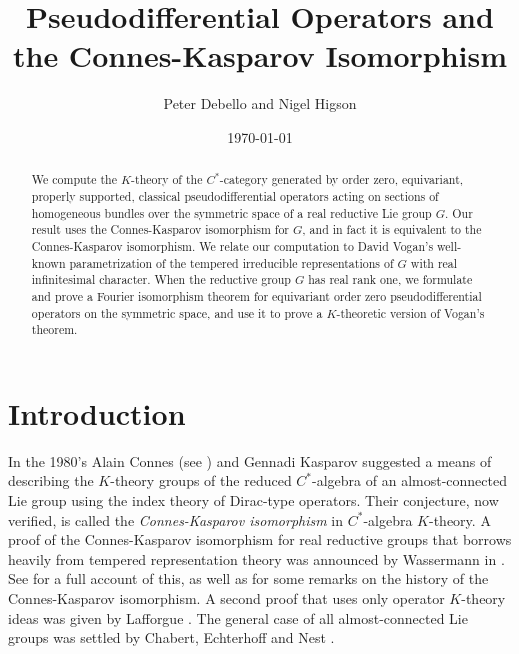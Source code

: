 \documentclass[leqno,11pt]{amsart}
\numberwithin{equation}{subsection}
\theoremstyle{plain}
\theoremstyle{definition}
\theoremstyle{remark}
\begin{document}
 
\title[Pseudodifferential Operators and Connes-Kasparov]{Pseudodifferential Operators and the Connes-Kasparov Isomorphism} 
\author{Peter Debello and Nigel Higson}
\address{Department of Mathematics, Penn State University, University Park, PA 16802, USA}
 



\date{\today}

\begin{abstract}
We compute the $K$-theory of the $C^*$-category generated by order zero, equivariant, properly supported, classical  pseudodifferential  operators acting on sections of homogeneous bundles over the symmetric space  of a real reductive Lie group $G$. Our result uses the Connes-Kasparov isomorphism for $G$, and in fact it is equivalent to the Connes-Kasparov isomorphism.  We relate our computation to David Vogan's well-known param\-etrization of the tempered irreducible representations of $G$ with real infinitesimal character.  When the reductive group $G$ has real rank one, we formulate and prove a Fourier isomorphism theorem for equivariant order zero pseudodifferential operators on the symmetric space, and use it to prove a $K$-theoretic version of Vogan's theorem. 
\end{abstract}

\maketitle



\section{Introduction} 
In the 1980's Alain Connes (see \cite[Conj.~4.1]{Rosenberg84}) and Gennadi Kasparov \cite[Sec.~5, Conj.~1] {KasparovICM83}  suggested a means of describing the $K$-theory groups of the reduced $C^*$-algebra of an almost-connected Lie group using the index theory of Dirac-type operators.  
Their conjecture, now verified, is called the \emph{Connes-Kasparov isomorphism} in $C^*$-algebra $K$-theory.  A proof of the Connes-Kasparov isomorphism for real reductive groups that borrows heavily from tempered representation theory  was  announced by Wassermann in \cite{Wassermann87}. See \cite{ClareHigsonSongTang24,ClareHigsonSong24} for a full account of this, as well as for some remarks on the history of the Connes-Kasp\-arov isomorphism.  A second proof that uses  only operator $K$-theory ideas was given by Lafforgue \cite{Lafforgue02InventMath}. The general case of all almost-con\-nected Lie groups was settled by Chabert, Echterhoff and Nest \cite{ChabertEchterhoffNest03}.
\end{document}
